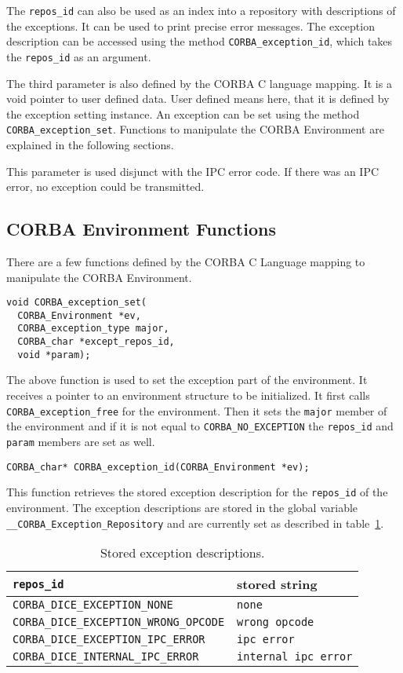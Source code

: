 The \verb|repos_id| can also be used as an index into a
repository with descriptions of the exceptions. It can be
used to print precise error messages. The exception description
can be accessed using the method \verb|CORBA_exception_id|,
which takes the \verb|repos_id| as an argument.

The third parameter is also defined by the CORBA C language
mapping. It is a void pointer to user defined data. User defined
means here, that it is defined by the exception setting instance.
An exception can be set using the method \verb|CORBA_exception_set|.
Functions to manipulate the CORBA Environment are explained
in the following sections.

This parameter is used disjunct with the IPC error code.  If there
was an IPC error, no exception could be transmitted.

\subsection{CORBA Environment Functions}

There are a few functions defined by the CORBA C Language
mapping \cite{corba-clm} to manipulate the CORBA Environment.

\begin{verbatim}
void CORBA_exception_set(
  CORBA_Environment *ev,
  CORBA_exception_type major,
  CORBA_char *except_repos_id,
  void *param);
\end{verbatim}

The above function is used to set the exception part
of the environment. It receives a pointer to an
environment structure to be initialized. It first calls
\verb|CORBA_exception_free| for the environment. Then
it sets the \verb|major| member of the environment and
if it is not equal to \verb|CORBA_NO_EXCEPTION| the
\verb|repos_id| and \verb|param| members are set as well.

\begin{verbatim}
CORBA_char* CORBA_exception_id(CORBA_Environment *ev);
\end{verbatim}

This function retrieves the stored exception description
for the \verb|repos_id| of the environment. The exception
descriptions are stored in the global variable
\verb|__CORBA_Exception_Repository| and are currently set
as described in table~\ref{tab:reposid}.

\begin{table}[ht]
\caption{\label{tab:reposid} Stored exception descriptions.}
\begin{tabular}{|l|l|} \hline
\verb|repos_id| & stored string \\ \hline \hline
\verb|CORBA_DICE_EXCEPTION_NONE| & {\tt none} \\ \hline
\verb|CORBA_DICE_EXCEPTION_WRONG_OPCODE| & {\tt wrong opcode} \\ \hline
\verb|CORBA_DICE_EXCEPTION_IPC_ERROR| & {\tt ipc error} \\ \hline
\verb|CORBA_DICE_INTERNAL_IPC_ERROR| & {\tt internal ipc error} \\ \hline
\end{tabular}
\end{table}

